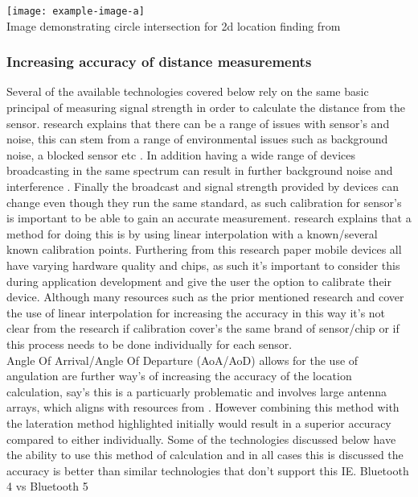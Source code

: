 \begin{center}
	\texttt{[image: example-image-a]}\\
	Image demonstrating circle intersection for 2d location finding from \citetemp
\end{center}

\subsubsection{Increasing accuracy of distance measurements}
Several of the available technologies covered below rely on the same basic principal of measuring signal strength in order to calculate the distance from the sensor. \citetemp research explains that there can be a range of issues with sensor's and noise, this can stem from a range of environmental issues such as background noise, a blocked sensor etc \citetemp. In addition having a wide range of devices broadcasting in the same spectrum can result in further background noise and interference \citetemp. Finally the broadcast and signal strength provided by devices can change even though they run the same standard, as such calibration for sensor's is important to be able to gain an accurate measurement. \citetemp research explains that a method for doing this is by using linear interpolation with a known/several known calibration points. Furthering from this research paper mobile devices all have varying hardware quality and chips, as such it's important to consider this during application development and give the user the option to calibrate their device. Although many resources such as the prior mentioned research and \citetemp cover the use of linear interpolation for increasing the accuracy in this way it's not clear from the research if calibration cover's the same brand of sensor/chip or if this process needs to be done individually for each sensor.\\ 

Angle Of Arrival/Angle Of Departure (AoA/AoD) allows for the use of angulation are further way's of increasing the accuracy of the location calculation, \citetemp say's this is a particuarly problematic and involves large antenna arrays, which aligns with resources from \citetemp. However combining this method with the lateration method highlighted initially would result in a superior accuracy compared to either individually. Some of the technologies discussed below have the ability to use this method of calculation and in all cases this is discussed the accuracy is better than similar technologies that don't support this IE. Bluetooth 4 vs Bluetooth 5 \citetemp

